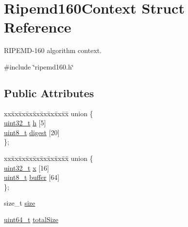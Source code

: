 \hypertarget{structRipemd160Context}{}\section{Ripemd160\+Context Struct Reference}
\label{structRipemd160Context}


R\+I\+P\+E\+M\+D-\/160 algorithm context.  




{\ttfamily \#include \char`\"{}ripemd160.\+h\char`\"{}}

\subsection*{Public Attributes}
\begin{DoxyCompactItemize}
\item 
\begin{tabbing}
xx\=xx\=xx\=xx\=xx\=xx\=xx\=xx\=xx\=\kill
union \{\\
\>\hyperlink{stdint_8h_a435d1572bf3f880d55459d9805097f62}{uint32\_t} \hyperlink{structRipemd160Context_a6c5ff8f0ea800ef3d9fc426d316556e4}{h} \mbox{[}5\mbox{]}\\
\>\hyperlink{stdint_8h_aba7bc1797add20fe3efdf37ced1182c5}{uint8\_t} \hyperlink{structRipemd160Context_adc5a38ab33e19b025767fce363b2b90a}{digest} \mbox{[}20\mbox{]}\\
\}; \\

\end{tabbing}\item 
\begin{tabbing}
xx\=xx\=xx\=xx\=xx\=xx\=xx\=xx\=xx\=\kill
union \{\\
\>\hyperlink{stdint_8h_a435d1572bf3f880d55459d9805097f62}{uint32\_t} \hyperlink{structRipemd160Context_a379a476500ffa72b9aab1492bfa7dd7a}{x} \mbox{[}16\mbox{]}\\
\>\hyperlink{stdint_8h_aba7bc1797add20fe3efdf37ced1182c5}{uint8\_t} \hyperlink{structRipemd160Context_a5edd8e76546b440a0f2b9918288c8d75}{buffer} \mbox{[}64\mbox{]}\\
\}; \\

\end{tabbing}\item 
size\+\_\+t \hyperlink{structRipemd160Context_aaa2e817af0eb5951231c1c68593e979c}{size}
\item 
\hyperlink{stdint_8h_aec6fcb673ff035718c238c8c9d544c47}{uint64\+\_\+t} \hyperlink{structRipemd160Context_a0667a665699002d8b5020c0ee40ef829}{total\+Size}
\end{DoxyCompactItemize}


